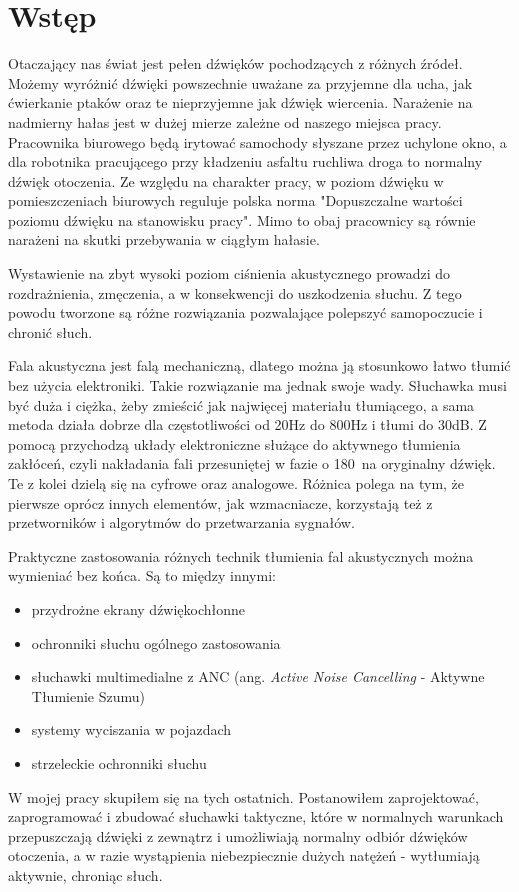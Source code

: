 \chapter{Wstęp}
\label{cha:wstep}

Otaczający nas świat jest pełen dźwięków pochodzących z różnych źródeł. Możemy wyróżnić dźwięki powszechnie uważane za przyjemne dla ucha, jak ćwierkanie ptaków oraz te nieprzyjemne jak dźwięk wiercenia. Narażenie na nadmierny hałas jest w dużej mierze zależne od naszego miejsca pracy. Pracownika biurowego będą irytować samochody słyszane przez uchylone okno, a dla robotnika pracującego przy kładzeniu asfaltu ruchliwa droga to normalny dźwięk otoczenia. Ze względu na charakter pracy, w poziom dźwięku w pomieszczeniach biurowych reguluje polska norma "Dopuszczalne wartości poziomu dźwięku na stanowisku pracy"\cite{PolskaNormaCisnienia}. Mimo to obaj pracownicy są równie narażeni na skutki przebywania w ciągłym hałasie.

Wystawienie na zbyt wysoki poziom ciśnienia akustycznego prowadzi do rozdrażnienia, zmęczenia, a w konsekwencji do uszkodzenia słuchu. Z tego powodu tworzone są różne rozwiązania pozwalające polepszyć samopoczucie i chronić słuch. 

Fala akustyczna jest falą mechaniczną, dlatego można ją stosunkowo łatwo tłumić bez użycia elektroniki. Takie rozwiązanie ma jednak swoje wady. Słuchawka musi być duża i ciężka, żeby zmieścić jak najwięcej materiału tłumiącego, a sama metoda działa dobrze dla częstotliwości od 20Hz do 800Hz i tłumi do 30dB\cite{SennheiserANC}. Z pomocą przychodzą układy elektroniczne służące do aktywnego tłumienia zakłóceń, czyli nakładania fali przesuniętej w fazie o 180\textdegree\ na oryginalny dźwięk. Te z kolei dzielą się na cyfrowe oraz analogowe. Różnica polega na tym, że pierwsze oprócz innych elementów, jak wzmacniacze, korzystają też z przetworników i algorytmów do przetwarzania sygnałów.

Praktyczne zastosowania różnych technik tłumienia fal akustycznych można wymieniać bez końca. Są to między innymi:
\begin{itemize}
	\item przydrożne ekrany dźwiękochłonne
	\item ochronniki słuchu ogólnego zastosowania
	\item słuchawki multimedialne z ANC (ang. \textit{Active Noise Cancelling} - Aktywne Tłumienie Szumu)
	\item systemy wyciszania w pojazdach
	\item strzeleckie ochronniki słuchu
\end{itemize}

W mojej pracy skupiłem się na tych ostatnich. Postanowiłem zaprojektować, zaprogramować i zbudować słuchawki taktyczne, które w normalnych warunkach przepuszczają dźwięki z zewnątrz i umożliwiają normalny odbiór dźwięków otoczenia, a w razie wystąpienia niebezpiecznie dużych natężeń - wytłumiają aktywnie, chroniąc słuch.